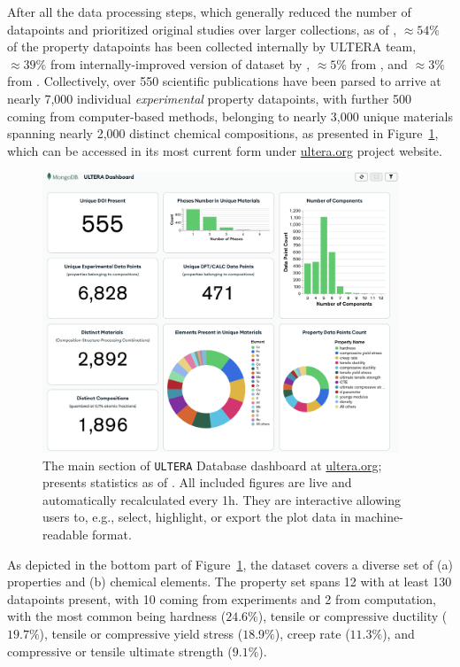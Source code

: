 After all the data processing steps, which generally reduced the number of datapoints and prioritized original studies over larger collections, as of \statisticstime, $\approx54\%$ of the property datapoints has been collected internally by ULTERA team, $\approx39\%$ from internally-improved version of dataset by \citet{Borg2020ExpandedAlloys}, $\approx5\%$ from \citet{Yang2022AHardness}, and $\approx3\%$ from \citet{Wang2023SearchingExperiments}. Collectively, over 550 scientific publications have been parsed to arrive at nearly 7,000 individual \textit{experimental} property datapoints, with further 500 coming from computer-based methods, belonging to nearly 3,000 unique materials spanning nearly 2,000 distinct chemical compositions, as presented in Figure~\ref{ultera:fig:dashboard}, which can be accessed in its most current form under \href{https://ultera.org}{ultera.org} project website.

\begin{figure}[H]
    \centering
    \includegraphics[width=0.95\textwidth]{ultera/ULTERA_Dashboard.png}
    \caption{The main section of \texttt{ULTERA} Database dashboard at \href{https://ultera.org}{ultera.org}; presents statistics as of \statisticstime. All included figures are live and automatically recalculated every 1h. They are interactive allowing users to, e.g., select, highlight, or export the plot data in machine-readable format.}
    \label{ultera:fig:dashboard}
\end{figure}

As depicted in the bottom part of Figure~\ref{ultera:fig:dashboard}, the dataset covers a diverse set of (a) properties and (b) chemical elements. The property set spans 12 with at least 130 datapoints present, with 10 coming from experiments and 2 from computation, with the most common being hardness ($24.6\%$), tensile or compressive ductility ($19.7\%$), tensile or compressive yield stress ($18.9\%$), creep rate ($11.3\%$), and compressive or tensile ultimate strength ($9.1\%$).

